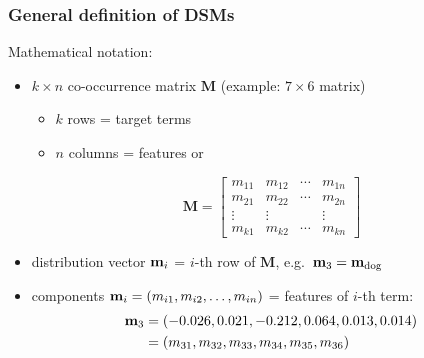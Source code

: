 \begin{frame}
  \frametitle{General definition of DSMs}

  Mathematical notation:
  \begin{itemize}
  \item $k \times n$ co-occurrence matrix $\mathbf{M}$ (example: $7\times 6$ matrix)
    \begin{itemize}
    \item $k$ rows = target terms
    \item $n$ columns = features or 
    \end{itemize}
    \begin{small}
      \gap[.5]
      \[
      \mathbf{M} =
      \begin{bmatrix}
        m_{11} & m_{12} & \cdots & m_{1n} \\
        m_{21} & m_{22} & \cdots & m_{2n} \\
        \vdots & \vdots & & \vdots \\
        m_{k1} & m_{k2} & \cdots & m_{kn}
      \end{bmatrix}
      \]
    \end{small}
  \item distribution vector $\Vector{m}_i$ = $i$-th row of $\mathbf{M}$, e.g.\ $\Vector{m}_3 = \Vector{m}_{\text{dog}}$
  \item components $\Vector{m}_i = (m_{i1}, m_{i2}, \ldots, m_{in})$ = features of $i$-th term:
    \begin{align*}
      \Vector{m}_3 &= (-0.026, 0.021, -0.212, 0.064, 0.013, 0.014) \\
      &= (m_{31}, m_{32}, m_{33}, m_{34}, m_{35}, m_{36})
    \end{align*}
  \end{itemize}

\end{frame}

